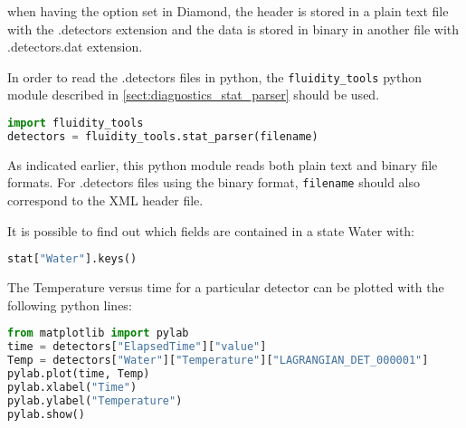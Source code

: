 when having the  option set in Diamond, the header is stored in a plain text file with the .detectors extension and the data is stored in binary in another file with .detectors.dat extension.

In order to read the .detectors files in python, the \lstinline[language = Python]*fluidity_tools* python module described in \ref{sect:diagnostics_stat_parser} should be used.

\begin{lstlisting}[language = Python]
import fluidity_tools
detectors = fluidity_tools.stat_parser(filename)
\end{lstlisting}

As indicated earlier, this python module reads both
plain text and binary file formats. For .detectors files using the binary
format, \lstinline[language = Python]*filename* should also correspond to the XML header file.

It is possible to find out which fields are contained in a state Water with:

\begin{lstlisting}[language=Python]
stat["Water"].keys()
\end{lstlisting}

The Temperature versus time for a particular detector can be plotted with the following python lines:

\begin{lstlisting}[language=Python]
from matplotlib import pylab
time = detectors["ElapsedTime"]["value"]
Temp = detectors["Water"]["Temperature"]["LAGRANGIAN_DET_000001"]
pylab.plot(time, Temp)
pylab.xlabel("Time")
pylab.ylabel("Temperature")
pylab.show()
\end{lstlisting}

